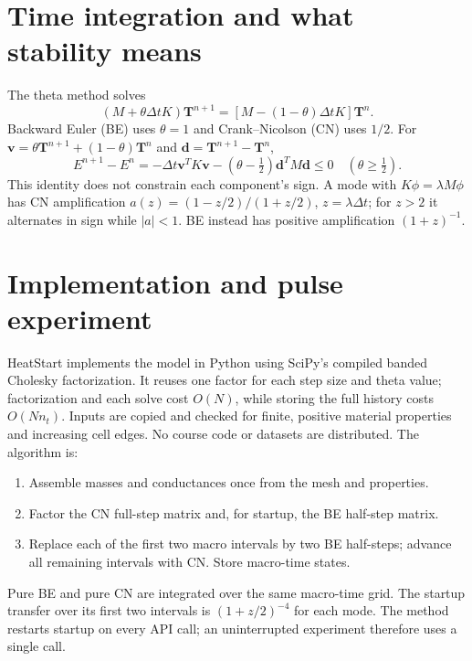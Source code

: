 \documentclass[11pt,a4paper]{article}
\begin{document}
\section{Time integration and what stability means}
The theta method solves
\begin{equation}\label{eq:theta}
 (M+\theta\Delta tK)\boldsymbol T^{n+1}
 =[M-(1-\theta)\Delta tK]\boldsymbol T^n.
\end{equation}
Backward Euler (BE) uses $\theta=1$ and Crank--Nicolson (CN) uses $1/2$.
For $\boldsymbol v=\theta\boldsymbol T^{n+1}+(1-\theta)\boldsymbol T^n$
and $\boldsymbol d=\boldsymbol T^{n+1}-\boldsymbol T^n$,
\begin{equation}
 E^{n+1}-E^n=-\Delta t\boldsymbol v^TK\boldsymbol v
 -(\theta-\tfrac12)\boldsymbol d^TM\boldsymbol d\leq0
 \quad(\theta\geq\tfrac12).
\end{equation}
This identity does not constrain each component's sign. A mode with
$K\phi=\lambda M\phi$ has CN amplification
$a(z)=(1-z/2)/(1+z/2)$, $z=\lambda\Delta t$; for $z>2$ it alternates in
sign while $|a|<1$. BE instead has positive amplification $(1+z)^{-1}$.

\newpage
\section{Implementation and pulse experiment}
HeatStart implements the model in Python using SciPy's compiled banded
Cholesky factorization. It reuses one factor for each step size and theta
value; factorization and each solve cost $O(N)$, while storing the full
history costs $O(Nn_t)$. Inputs are copied and checked for finite, positive
material properties and increasing cell edges. No course code or datasets
are distributed. The algorithm is:
\begin{enumerate}
\item Assemble masses and conductances once from the mesh and properties.
\item Factor the CN full-step matrix and, for startup, the BE half-step matrix.
\item Replace each of the first two macro intervals by two BE half-steps;
      advance all remaining intervals with CN. Store macro-time states.
\end{enumerate}
Pure BE and pure CN are integrated over the same macro-time grid. The startup
transfer over its first two intervals is $(1+z/2)^{-4}$ for each mode.
The method restarts startup on every API call; an uninterrupted experiment
therefore uses a single call.
\end{document}
